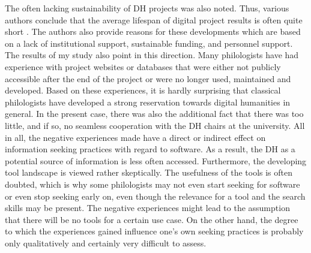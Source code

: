 \documentclass[12pt, a4paper, titlepage, oneside, abstract=true, toc=listof, toc=bibliography, BCOR=1cm]{scrreprt}
\begin{document}
{The often lacking sustainability of DH projects was also noted. Thus, various authors conclude that the average lifespan of digital project results is often quite short \citep[e.g.][]{Neuefeind2020, Zundert2012}. The authors also provide reasons for these developments which are based on a lack of institutional support, sustainable funding, and personnel support. The results of my study also point in this direction. Many philologists have had experience with project websites or databases that were either not publicly accessible after the end of the project or were no longer used, maintained and developed. Based on these experiences, it is hardly surprising that classical philologists have developed a strong reservation towards digital humanities in general. In the present case, there was also the additional fact that there was too little, and if so, no seamless cooperation with the DH chairs at the university.  All in all, the negative experiences made have a direct or indirect effect on information seeking practices with regard to software. As a result, the DH as a potential source of information is less often accessed. Furthermore, the developing tool landscape is viewed rather skeptically. The usefulness of the tools is often doubted, which is why some philologists may not even start seeking for software or even stop seeking early on, even though the relevance for a tool and the search skills may be present. The negative experiences might lead to the assumption that there will be no tools for a certain use case. On the other hand, the degree to which the experiences gained influence one's own seeking practices is probably only qualitatively and certainly very difficult to assess.

}
\end{document}
